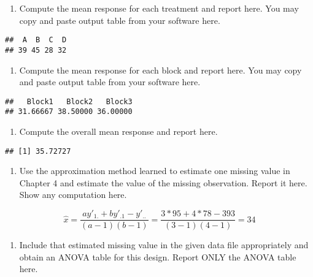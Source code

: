 \documentclass[]{article}
\providecommand{\tightlist}{%
  \setlength{\itemsep}{0pt}\setlength{\parskip}{0pt}}
\begin{document}
\begin{enumerate}
\def\labelenumi{(\alph{enumi})}
\tightlist
\item
  Compute the mean response for each treatment and report here. You may
  copy and paste output table from your software here.
\end{enumerate}

\begin{verbatim}
##  A  B  C  D 
## 39 45 28 32
\end{verbatim}

\begin{enumerate}
\def\labelenumi{(\alph{enumi})}
\setcounter{enumi}{1}
\tightlist
\item
  Compute the mean response for each block and report here. You may copy
  and paste output table from your software here.
\end{enumerate}

\begin{verbatim}
##   Block1   Block2   Block3 
## 31.66667 38.50000 36.00000
\end{verbatim}

\begin{enumerate}
\def\labelenumi{(\alph{enumi})}
\setcounter{enumi}{2}
\tightlist
\item
  Compute the overall mean response and report here.
\end{enumerate}

\begin{verbatim}
## [1] 35.72727
\end{verbatim}

\begin{enumerate}
\def\labelenumi{(\alph{enumi})}
\setcounter{enumi}{3}
\tightlist
\item
  Use the approximation method learned to estimate one missing value in
  Chapter 4 and estimate the value of the missing observation. Report it
  here. Show any computation here.
\end{enumerate}

\[\hat x=\frac{ay'_{1.}+by'_{.1}-y'_{..}}{(a-1)(b-1)}=\frac{3*95+4*78-393}{(3-1)(4-1)}=34\]

\begin{enumerate}
\def\labelenumi{(\alph{enumi})}
\setcounter{enumi}{4}
\tightlist
\item
  Include that estimated missing value in the given data file
  appropriately and obtain an ANOVA table for this design. Report ONLY
  the ANOVA table here.
\end{enumerate}
\end{document}
